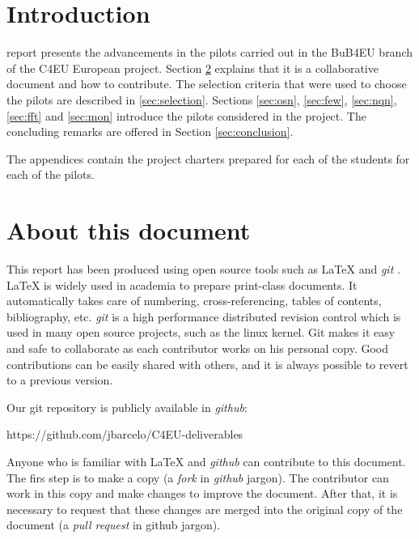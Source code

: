 \documentclass[draftclsnofoot,12pt,journal,onecolumn]{IEEEtran}
\begin{document}
\section{Introduction}
% 
% 
% 
% 
 report presents the advancements in the pilots carried out in the BuB4EU branch of the C4EU European project.
Section \ref{sec:about} explains that it is a collaborative document and how to contribute.
The selection criteria that were used to choose the pilots are described in \ref{sec:selection}.
Sections \ref{sec:osn}, \ref{sec:few}, \ref{sec:nqn}, \ref{sec:fft} and \ref{sec:mon} introduce the pilots considered in the project.
The concluding remarks are offered in Section \ref{sec:conclusion}.

The appendices contain the project charters prepared for each of the students for each of the pilots.

\section{About this document}
\label{sec:about}

This report has been produced using open source tools such as {\LaTeX} \cite{lamport1994ldp} and \emph{git} \cite{chacon2009pg}.
{\LaTeX} is widely used in academia to prepare print-class documents.
It automatically takes care of numbering, cross-referencing, tables of contents, bibliography, etc.
\emph{git} is a high performance distributed revision control which is used in many open source projects, such as the linux kernel.
Git makes it easy and safe to collaborate as each contributor works on his personal copy.
Good contributions can be easily shared with others, and it is always possible to revert to a previous version.

Our git repository is publicly available in \emph{github}:

https://github.com/jbarcelo/C4EU-deliverables

Anyone who is familiar with {\LaTeX} and \emph{github} can contribute to this document.
The firs step is to make a copy (a \emph{fork} in \emph{github} jargon).
The contributor can work in this copy and make changes to improve the document.
After that, it is necessary to request that these changes are merged into the original copy of the document (a \emph{pull request} in github jargon).
\end{document}
